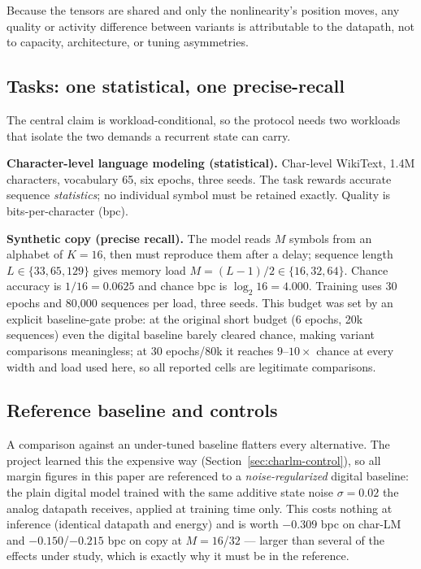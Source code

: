 Because the tensors are shared and only the nonlinearity's position moves, any quality or
activity difference between variants is attributable to the datapath, not to capacity,
architecture, or tuning asymmetries.

\subsection{Tasks: one statistical, one precise-recall}
\label{sec:tasks}

The central claim is workload-conditional, so the protocol needs two workloads that isolate
the two demands a recurrent state can carry.

\textbf{Character-level language modeling (statistical).} Char-level WikiText, 1.4M characters,
vocabulary 65, six epochs, three seeds. The task rewards accurate sequence \emph{statistics};
no individual symbol must be retained exactly. Quality is bits-per-character (bpc).

\textbf{Synthetic copy (precise recall).} The model reads $M$ symbols from an alphabet of
$K{=}16$, then must reproduce them after a delay; sequence length $L \in \{33, 65, 129\}$ gives
memory load $M = (L{-}1)/2 \in \{16, 32, 64\}$. Chance accuracy is $1/16 = 0.0625$ and chance
bpc is $\log_2 16 = 4.000$. Training uses 30 epochs and 80{,}000 sequences per load, three
seeds. This budget was set by an explicit baseline-gate probe: at the original short budget
(6 epochs, 20k sequences) even the digital baseline barely cleared chance, making variant
comparisons meaningless; at 30 epochs/80k it reaches $9$--$10\times$ chance at every width and
load used here, so all reported cells are legitimate comparisons.

\subsection{Reference baseline and controls}
\label{sec:controls}

A comparison against an under-tuned baseline flatters every alternative. The project learned
this the expensive way (Section~\ref{sec:charlm-control}), so all margin figures in this paper
are referenced to a \emph{noise-regularized} digital baseline: the plain digital model trained
with the same additive state noise $\sigma{=}0.02$ the analog datapath receives, applied at
training time only. This costs nothing at inference (identical datapath and energy) and is
worth $-0.309$ bpc on char-LM and $-0.150$/$-0.215$ bpc on copy at $M{=}16$/$32$ --- larger
than several of the effects under study, which is exactly why it must be in the reference.

